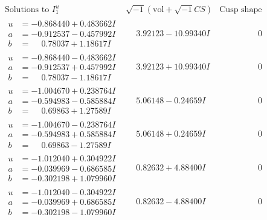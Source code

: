 \documentclass[1p]{elsarticle_modified}
\theoremstyle{definition}
\newcommand{\I}{\sqrt{-1}}
\begin{document}
$$\begin{array}{c|c|c}  
\text{Solutions to }I^u_{1}& \I (\text{vol} + \sqrt{-1}CS) & \text{Cusp shape}\\
 \hline 
\begin{aligned}
u &= -0.868440 + 0.483662 I \\
a &= -0.912537 - 0.457992 I \\
b &= \phantom{-}0.78037 + 1.18617 I\end{aligned}
 & \phantom{-}3.92123 - 10.99340 I & \phantom{-0.000000 } 0 \\ \hline\begin{aligned}
u &= -0.868440 - 0.483662 I \\
a &= -0.912537 + 0.457992 I \\
b &= \phantom{-}0.78037 - 1.18617 I\end{aligned}
 & \phantom{-}3.92123 + 10.99340 I & \phantom{-0.000000 } 0 \\ \hline\begin{aligned}
u &= -1.004670 + 0.238764 I \\
a &= -0.594983 - 0.585884 I \\
b &= \phantom{-}0.69863 + 1.27589 I\end{aligned}
 & \phantom{-}5.06148 - 0.24659 I & \phantom{-0.000000 } 0 \\ \hline\begin{aligned}
u &= -1.004670 - 0.238764 I \\
a &= -0.594983 + 0.585884 I \\
b &= \phantom{-}0.69863 - 1.27589 I\end{aligned}
 & \phantom{-}5.06148 + 0.24659 I & \phantom{-0.000000 } 0 \\ \hline\begin{aligned}
u &= -1.012040 + 0.304922 I \\
a &= -0.039969 - 0.686585 I \\
b &= -0.302198 + 1.079960 I\end{aligned}
 & \phantom{-}0.82632 + 4.88400 I & \phantom{-0.000000 } 0 \\ \hline\begin{aligned}
u &= -1.012040 - 0.304922 I \\
a &= -0.039969 + 0.686585 I \\
b &= -0.302198 - 1.079960 I\end{aligned}
 & \phantom{-}0.82632 - 4.88400 I & \phantom{-0.000000 } 0 \\ \hline\begin{aligned}

\end{aligned}
\end{array}$$
\end{document}
